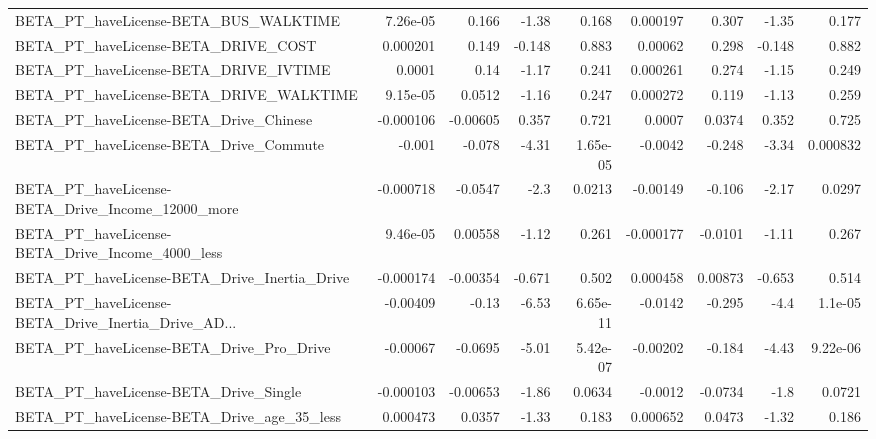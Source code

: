\begin{tabular}{lrrrrrrrr}
BETA\_PT\_haveLicense-BETA\_BUS\_WALKTIME              &    7.26e-05 &        0.166 &    -1.38 &    0.168 &   0.000197 &       0.307 &        -1.35 &         0.177 \\
BETA\_PT\_haveLicense-BETA\_DRIVE\_COST                &    0.000201 &        0.149 &   -0.148 &    0.883 &    0.00062 &       0.298 &       -0.148 &         0.882 \\
BETA\_PT\_haveLicense-BETA\_DRIVE\_IVTIME              &      0.0001 &         0.14 &    -1.17 &    0.241 &   0.000261 &       0.274 &        -1.15 &         0.249 \\
BETA\_PT\_haveLicense-BETA\_DRIVE\_WALKTIME            &    9.15e-05 &       0.0512 &    -1.16 &    0.247 &   0.000272 &       0.119 &        -1.13 &         0.259 \\
BETA\_PT\_haveLicense-BETA\_Drive\_Chinese             &   -0.000106 &     -0.00605 &    0.357 &    0.721 &     0.0007 &      0.0374 &        0.352 &         0.725 \\
BETA\_PT\_haveLicense-BETA\_Drive\_Commute             &      -0.001 &       -0.078 &    -4.31 & 1.65e-05 &    -0.0042 &      -0.248 &        -3.34 &      0.000832 \\
BETA\_PT\_haveLicense-BETA\_Drive\_Income\_12000\_more   &   -0.000718 &      -0.0547 &     -2.3 &   0.0213 &   -0.00149 &      -0.106 &        -2.17 &        0.0297 \\
BETA\_PT\_haveLicense-BETA\_Drive\_Income\_4000\_less    &    9.46e-05 &      0.00558 &    -1.12 &    0.261 &  -0.000177 &     -0.0101 &        -1.11 &         0.267 \\
BETA\_PT\_haveLicense-BETA\_Drive\_Inertia\_Drive       &   -0.000174 &     -0.00354 &   -0.671 &    0.502 &   0.000458 &     0.00873 &       -0.653 &         0.514 \\
BETA\_PT\_haveLicense-BETA\_Drive\_Inertia\_Drive\_AD... &    -0.00409 &        -0.13 &    -6.53 & 6.65e-11 &    -0.0142 &      -0.295 &         -4.4 &       1.1e-05 \\
BETA\_PT\_haveLicense-BETA\_Drive\_Pro\_Drive           &    -0.00067 &      -0.0695 &    -5.01 & 5.42e-07 &   -0.00202 &      -0.184 &        -4.43 &      9.22e-06 \\
BETA\_PT\_haveLicense-BETA\_Drive\_Single              &   -0.000103 &     -0.00653 &    -1.86 &   0.0634 &    -0.0012 &     -0.0734 &         -1.8 &        0.0721 \\
BETA\_PT\_haveLicense-BETA\_Drive\_age\_35\_less         &    0.000473 &       0.0357 &    -1.33 &    0.183 &   0.000652 &      0.0473 &        -1.32 &         0.186 \\

\end{tabular}
